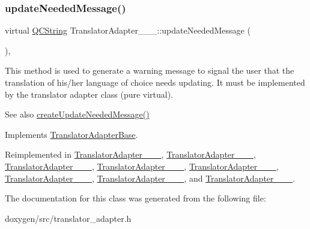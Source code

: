 \subsubsection{\texorpdfstring{updateNeededMessage()}{updateNeededMessage()}}
{\footnotesize\ttfamily virtual \mbox{\hyperlink{class_q_c_string}{Q\+C\+String}} Translator\+Adapter\+\_\+\_\+\_\+::update\+Needed\+Message (\begin{DoxyParamCaption}{ }\end{DoxyParamCaption})\hspace{0.3cm}{\ttfamily [inline]}, {\ttfamily [virtual]}}

This method is used to generate a warning message to signal the user that the translation of his/her language of choice needs updating. It must be implemented by the translator adapter class (pure virtual).

\begin{DoxySeeAlso}{See also}
\mbox{\hyperlink{class_translator_adapter_base_a71493b87a34d6e4c232e540734aba698}{create\+Update\+Needed\+Message()}} 
\end{DoxySeeAlso}


Implements \mbox{\hyperlink{class_translator_adapter_base_acc5b89c39bae2a9bca490016ec15c79f}{Translator\+Adapter\+Base}}.



Reimplemented in \mbox{\hyperlink{class_translator_adapter__1__4__6_ab19b01d4e00c95ef1e6eb631fbe6ada4}{Translator\+Adapter\+\_\+\_\+\_}}, \mbox{\hyperlink{class_translator_adapter__1__5__4_a587a31dad925e47f206b6a0cda9eedd0}{Translator\+Adapter\+\_\+\_\+\_}}, \mbox{\hyperlink{class_translator_adapter__1__6__0_abc231eb2c1864ca9f878e7e5deb94f54}{Translator\+Adapter\+\_\+\_\+\_}}, \mbox{\hyperlink{class_translator_adapter__1__6__3_ab3d79abfb926c41bd7609eeb706654fe}{Translator\+Adapter\+\_\+\_\+\_}}, \mbox{\hyperlink{class_translator_adapter__1__7__5_a6e69d48e79a13c9d934f9af1a8befd8a}{Translator\+Adapter\+\_\+\_\+\_}}, \mbox{\hyperlink{class_translator_adapter__1__8__0_a47cedb130d9a178d9c632584d4f2abec}{Translator\+Adapter\+\_\+\_\+\_}}, \mbox{\hyperlink{class_translator_adapter__1__8__2_a307747456f69ab8dcb0c2be27f429e80}{Translator\+Adapter\+\_\+\_\+\_}}, and \mbox{\hyperlink{class_translator_adapter__1__8__4_a87dbcf9a99bf2ddfd9593461d331b714}{Translator\+Adapter\+\_\+\_\+\_}}.



The documentation for this class was generated from the following file\+:\begin{DoxyCompactItemize}
\item 
doxygen/src/translator\+\_\+adapter.\+h\end{DoxyCompactItemize}

